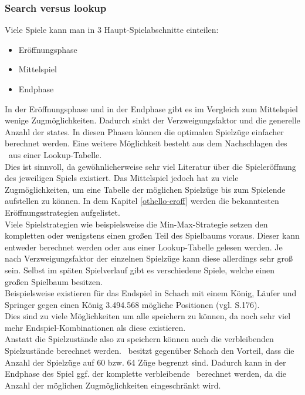\subsubsection{Search versus lookup}
Viele Spiele kann man in 3 Haupt-Spielabschnitte einteilen:
\begin{itemize}
\item Eröffnungsphase
\item Mittelspiel
\item Endphase
\end{itemize}
In der Eröffnungsphase und in der Endphase gibt es im Vergleich zum Mittelspiel wenige Zugmöglichkeiten. Dadurch sinkt der Verzweigungsfaktor und die generelle Anzahl der states. In diesen Phasen können die optimalen Spielzüge einfacher berechnet werden. Eine weitere Möglichkeit besteht aus dem Nachschlagen des \states\ aus einer Lookup-Tabelle.
\\Dies ist sinnvoll, da gewöhnlicherweise sehr viel Literatur über die Spieleröffnung des jeweiligen Spiels existiert.%
Das Mittelspiel jedoch hat zu viele Zugmöglichkeiten, um eine Tabelle der möglichen Spielzüge bis zum Spielende aufstellen zu können. In dem Kapitel \ref{othello-eroff} werden die bekanntesten Eröffnungsstrategien aufgelistet.
\\Viele Spielstrategien wie beispielsweise die Min-Max-Strategie setzen den kompletten oder wenigstens einen großen Teil des Spielbaums voraus. Dieser kann entweder berechnet werden oder aus einer Lookup-Tabelle gelesen werden. Je nach Verzweigungsfaktor der einzelnen Spielzüge kann diese allerdings sehr groß sein. Selbst im späten Spielverlauf gibt es verschiedene Spiele, welche einen großen Spielbaum besitzen.
\\Beispielsweise existieren für das Endspiel in Schach mit einem König, Läufer und Springer gegen einen König 3.494.568 mögliche Positionen (vgl. \cite{Russell.2016} S.176).
\\Dies sind zu viele Möglichkeiten um alle speichern zu können, da noch sehr viel mehr Endspiel-Kombinationen als diese existieren.
\\Anstatt die Spielzustände also zu speichern können auch die verbleibenden Spielzustände berechnet werden. \ot\ besitzt gegenüber Schach den Vorteil, dass die Anzahl der Spielzüge auf 60 bzw. 64 Züge begrenzt sind. Dadurch kann in der Endphase des Spiel ggf. der komplette verbleibende \gtree\ berechnet werden, da die Anzahl der möglichen Zugmöglichkeiten eingeschränkt wird.
